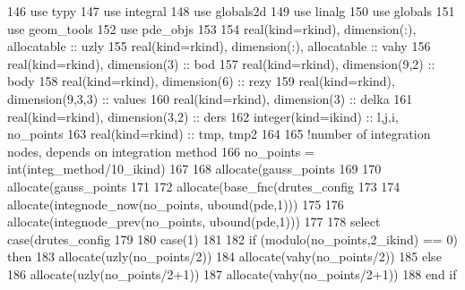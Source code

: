 \begin{DoxyCode}
146       \textcolor{keywordtype}{use }typy
147       \textcolor{keywordtype}{use }integral
148       \textcolor{keywordtype}{use }globals2d
149       \textcolor{keywordtype}{use }linalg
150       \textcolor{keywordtype}{use }globals
151       \textcolor{keywordtype}{use }geom_tools
152       \textcolor{keywordtype}{use }pde_objs
153       
154       \textcolor{keywordtype}{real(kind=rkind)}, \textcolor{keywordtype}{dimension(:)}, \textcolor{keywordtype}{allocatable} :: uzly
155       \textcolor{keywordtype}{real(kind=rkind)}, \textcolor{keywordtype}{dimension(:)}, \textcolor{keywordtype}{allocatable} :: vahy
156       \textcolor{keywordtype}{real(kind=rkind)}, \textcolor{keywordtype}{dimension(3)} :: bod
157       \textcolor{keywordtype}{real(kind=rkind)}, \textcolor{keywordtype}{dimension(9,2)} :: body
158       \textcolor{keywordtype}{real(kind=rkind)}, \textcolor{keywordtype}{dimension(6)} :: rezy
159       \textcolor{keywordtype}{real(kind=rkind)}, \textcolor{keywordtype}{dimension(9,3,3)} :: values
160       \textcolor{keywordtype}{real(kind=rkind)}, \textcolor{keywordtype}{dimension(3)} :: delka
161       \textcolor{keywordtype}{real(kind=rkind)}, \textcolor{keywordtype}{dimension(3,2)} :: ders
162       \textcolor{keywordtype}{integer(kind=ikind)} :: l,j,i, no\_points
163       \textcolor{keywordtype}{real(kind=rkind)} :: tmp, tmp2
164       
165       \textcolor{comment}{!number of integration nodes, depends on integration method}
166       no\_points = int(integ_method/10\_ikind)
167 
168       \textcolor{keyword}{allocate}(gauss_points%
169 
170       \textcolor{keyword}{allocate}(gauss_points%
171       
172       \textcolor{keyword}{allocate}(base_fnc(drutes_config%
173 
174       \textcolor{keyword}{allocate}(integnode_now(no\_points, ubound(pde,1)))
175 
176       \textcolor{keyword}{allocate}(integnode_prev(no\_points, ubound(pde,1)))
177 
178       \textcolor{keywordflow}{select case}(drutes_config%
179   
180         \textcolor{keywordflow}{case}(1)
181 
182           \textcolor{keywordflow}{if} (modulo(no\_points,2\_ikind) == 0) \textcolor{keywordflow}{then}
183             \textcolor{keyword}{allocate}(uzly(no\_points/2))
184             \textcolor{keyword}{allocate}(vahy(no\_points/2))
185           \textcolor{keywordflow}{else}
186             \textcolor{keyword}{allocate}(uzly(no\_points/2+1))
187             \textcolor{keyword}{allocate}(vahy(no\_points/2+1))
188 \textcolor{keywordflow}{          end if}

\end{DoxyCode}
